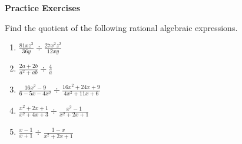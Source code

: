 \textbf{Practice Exercises}

\vspce

Find the quotient of the following rational algebraic expressions. 

\vspce

\begin{enumerate}[label = \arabic*. ]

\item \hspce $\displaystyle \frac{81xz^3}{36y} \div \frac{27x^2z^2}{12xy}$ 
\item \hspce $\displaystyle \frac{2a+2b}{a^2+ab} \div \frac{4}{a}$ 
\item \hspce $\displaystyle \frac{16x^2-9}{6-5x-4x^2} \div \frac{16x^2+24x+9}{4x^2+11x+6}$
\item \hspce $\displaystyle \frac{x^2+2x+1}{x^{2}+4x+3} \div \frac{x^2-1}{x^{2}+2x+1}$
\item \hspce $\displaystyle \frac{x-1}{x+1} \div \frac{1-x}{x^2+2x+1}$

\end{enumerate}
